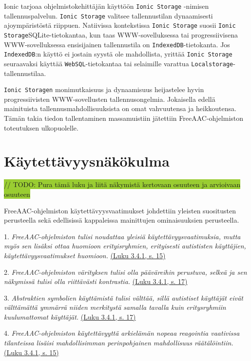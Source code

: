 \documentclass[utf8]{gradu3}
\begin{document}
Ionic tarjoaa ohjelmistokehittäjän käyttöön \texttt{Ionic Storage} -nimisen tallennuspalvelun. \texttt{Ionic Storage} valitsee tallennustilan dynaamisesti ajoympäristöstä riippuen. Natiivissa kontekstissa \texttt{Ionic Storage} suosii \texttt{Ionic Storage}SQLite-tietokantaa, kun taas WWW-sovelluksessa tai progressiivisena WWW-sovelluksessa ensisijainen tallennustila on \texttt{IndexedDB}-tietokanta. Jos \texttt{IndexedDB}:n käyttö ei jostain syystä ole mahdollista, yrittää \texttt{Ionic Storage} seuraavaksi käyttää \texttt{WebSQL}-tietokantaa tai selaimille varattua \texttt{Localstorage}-tallennustilaa.

\texttt{Ionic Storagen} monimutkaisuus ja dynaamisuus heijastelee hyvin progressiivisten WWW-sovellusten tallennusongelmia. Jokaisella edellä mainituista tallennusmahdollisuuksista on omat vahvuutensa ja heikkoutensa. Tämän takia tiedon tallentaminen massamuistiin jätettiin FreeAAC-ohjelmiston toteutuksen ulkopuolelle.

\section{Käytettävyysnäkökulma}

\colorbox{YellowGreen}{// TODO: Pura tämä luku ja liitä näkymistä kertovaan osuuteen ja arvioivaan osuuteen}

FreeAAC-ohjelmiston käytettävyysvaatimukset johdettiin yleisten suositusten perusteella sekä edellisissä kappaleissa mainittujen ominaisuuksien perusteella.

1. \textit{FreeAAC-ohjelmiston tulisi noudattaa yleisiä käytettävyysvaatimuksia, mutta myös sen lisäksi ottaa huomioon erityisryhmien, erityisesti autististen käyttäjien, käytettävyysvaatimukset huomioon.} \hyperref[general-usability-requirements]{(Luku 3.4.1, s. 15)}

2. \textit{FreeAAC-ohjelmiston värityksen tulisi olla pääväreihin perustuva, selkeä ja sen näkymissä tulisi olla riittävästi kontrastia.} \hyperref[AAC-colors]{(Luku 3.4.1, s. 17)}

3. \textit{Abstraktien symbolien käyttämistä tulisi välttää, sillä autistiset käyttäjät eivät välttämättä ymmärrä niiden merkitystä samalla tavalla kuin eritysryhmiin kuulumattomat käyttäjät.} \hyperref[AAC-abstract-symbols]{(Luku 3.4.1, s. 17)}

4. \textit{FreeAAC-ohjelmiston käytettävyyttä arkielämän nopeaa reagointia vaativissa tilanteissa lisäisi mahdollisimman perinpohjainen mahdollisuus räätälöintiin.} \hyperref[AAC-context-settings]{(Luku 3.4.1, s. 15)}
\end{document}
